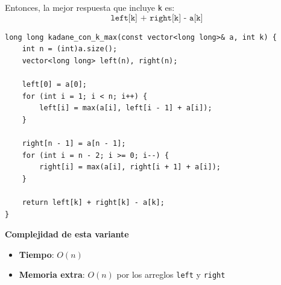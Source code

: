 Entonces, la mejor respuesta que incluye \texttt{k} es:
\[
\texttt{left[k] + right[k] - a[k]}
\]

\begin{lstlisting}[style=cppstyle, caption={Kadane maximo forzando incluir la posicion k (0-based)}]
long long kadane_con_k_max(const vector<long long>& a, int k) {
	int n = (int)a.size();
	vector<long long> left(n), right(n);

	left[0] = a[0];
	for (int i = 1; i < n; i++) {
		left[i] = max(a[i], left[i - 1] + a[i]);
	}

	right[n - 1] = a[n - 1];
	for (int i = n - 2; i >= 0; i--) {
		right[i] = max(a[i], right[i + 1] + a[i]);
	}

	return left[k] + right[k] - a[k];
}
\end{lstlisting}

\textbf{Complejidad de esta variante}
\begin{itemize}
\item \textbf{Tiempo}: $O(n)$
\item \textbf{Memoria extra}: $O(n)$ por los arreglos \texttt{left} y \texttt{right}
\end{itemize}

